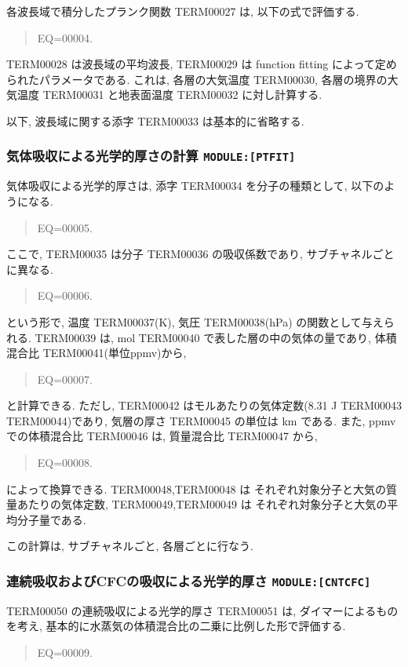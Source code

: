 各波長域で積分したプランク関数 TERM00027 は,
以下の式で評価する.

\begin{quote}
EQ=00004.
\end{quote}

TERM00028 は波長域の平均波長,
TERM00029 は function fitting によって定められたパラメータである.
これは, 各層の大気温度 TERM00030, 各層の境界の大気温度 TERM00031
と地表面温度 TERM00032 に対し計算する.

以下, 波長域に関する添字 TERM00033 は基本的に省略する.

\subsubsection{気体吸収による光学的厚さの計算 \texttt{MODULE:[PTFIT]}}

気体吸収による光学的厚さは, 添字 TERM00034 を分子の種類として,
以下のようになる. 

\begin{quote}
EQ=00005.
\end{quote}

ここで, TERM00035 は分子 TERM00036 の吸収係数であり, サブチャネルごとに異なる.

\begin{quote}
EQ=00006.
\end{quote}

という形で, 温度 TERM00037(K), 気圧 TERM00038(hPa) の関数として与えられる.
TERM00039 は, mol TERM00040 で表した層の中の気体の量であり,
体積混合比 TERM00041(単位ppmv)から,
\begin{quote}
EQ=00007.
\end{quote}
と計算できる. 
ただし, TERM00042 はモルあたりの気体定数(8.31 J TERM00043 TERM00044)であり,
気層の厚さ TERM00045 の単位は km である.
また, ppmv での体積混合比 TERM00046 は, 
質量混合比 TERM00047 から, 
\begin{quote}
EQ=00008.
\end{quote}
によって換算できる.
TERM00048,TERM00048 は
それぞれ対象分子と大気の質量あたりの気体定数,
TERM00049,TERM00049 は
それぞれ対象分子と大気の平均分子量である.

この計算は, サブチャネルごと, 各層ごとに行なう.

\subsubsection{連続吸収およびCFCの吸収による光学的厚さ \texttt{MODULE:[CNTCFC]}}

TERM00050 の連続吸収による光学的厚さ TERM00051 は,
ダイマーによるものを考え, 
基本的に水蒸気の体積混合比の二乗に比例した形で評価する.
\begin{quote}
EQ=00009.
\end{quote}

